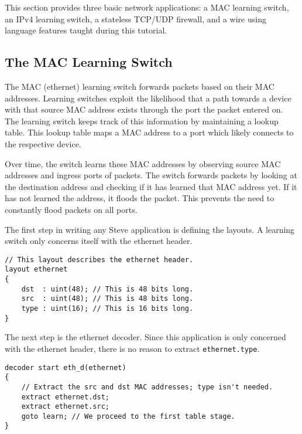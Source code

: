 This section provides three basic network applications: a MAC learning switch, an IPv4 learning switch, a stateless TCP/UDP firewall, and a
wire using language features taught during this tutorial.

\subsection{The MAC Learning Switch} \label{tut:learning_switch}

The MAC (ethernet) learning switch forwards packets based on their MAC addresses. Learning switches exploit the likelihood that a
path towards a device with that source MAC address exists through
the port the packet entered on. The learning switch keeps track of this information by maintaining a lookup table. This lookup table maps a MAC address to a port which likely connects to the respective device. 

Over time, the switch learns these MAC addresses by observing source MAC addresses and ingress ports of packets. The switch forwards packets by
looking at the destination address and checking if it has learned that MAC
address yet. If it has not learned the address, it floods the packet. This prevents the need to constantly flood packets on all ports.

The first step in writing any Steve application is defining the layouts. A
learning switch only concerns itself with the ethernet header.

\begin{codepage}
\begin{lstlisting}
// This layout describes the ethernet header.
layout ethernet
{
	dst  : uint(48); // This is 48 bits long.
	src  : uint(48); // This is 48 bits long.
	type : uint(16); // This is 16 bits long.
}
\end{lstlisting}
\end{codepage}

The next step is the ethernet decoder. Since this application is only concerned with the
ethernet header, there is no reason to extract
\texttt{ethernet.type}.

\begin{codepage}
\begin{lstlisting}
decoder start eth_d(ethernet)
{
	// Extract the src and dst MAC addresses; type isn't needed.
	extract ethernet.dst;
	extract ethernet.src;
	goto learn; // We proceed to the first table stage.
}
\end{lstlisting}
\end{codepage}

